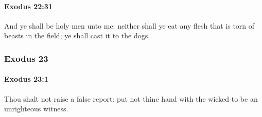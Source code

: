 		\paragraph{Exodus 22:31} %
			\label{EXODUS-22-31}

			And ye shall be holy men unto me: neither shall ye eat any flesh that is torn of beasts in the field; ye shall cast it to the dogs.

	\subsubsection{Exodus 23} %
		\label{EXODUS-23}

		\paragraph{Exodus 23:1} %
			\label{EXODUS-23-1}

			Thou shalt not raise a false report: put not thine hand with the wicked to be an unrighteous witness.

